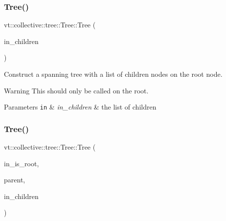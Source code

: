 \subsubsection{\texorpdfstring{Tree()}{Tree()}\hspace{0.1cm}{\footnotesize\ttfamily [2/3]}}
{\footnotesize\ttfamily vt\+::collective\+::tree\+::\+Tree\+::\+Tree (\begin{DoxyParamCaption}\item[{\hyperlink{structvt_1_1collective_1_1tree_1_1_tree_a834e7b54ea2dceae42db7c5ea859753f}{Node\+List\+Type} const \&}]{in\+\_\+children }\end{DoxyParamCaption})\hspace{0.3cm}{\ttfamily [explicit]}}



Construct a spanning tree with a list of children nodes on the root node. 

\begin{DoxyWarning}{Warning}
This should only be called on the root.
\end{DoxyWarning}

\begin{DoxyParams}[1]{Parameters}
\mbox{\tt in}  & {\em in\+\_\+children} & the list of children \\
\hline
\end{DoxyParams}
\mbox{\label{structvt_1_1collective_1_1tree_1_1_tree_a949f8b592559125bf225bd3828bd6b88}} 
\subsubsection{\texorpdfstring{Tree()}{Tree()}\hspace{0.1cm}{\footnotesize\ttfamily [3/3]}}
{\footnotesize\ttfamily vt\+::collective\+::tree\+::\+Tree\+::\+Tree (\begin{DoxyParamCaption}\item[{bool const}]{in\+\_\+is\+\_\+root,  }\item[{\hyperlink{namespacevt_a866da9d0efc19c0a1ce79e9e492f47e2}{Node\+Type} const \&}]{parent,  }\item[{\hyperlink{structvt_1_1collective_1_1tree_1_1_tree_a834e7b54ea2dceae42db7c5ea859753f}{Node\+List\+Type} const \&}]{in\+\_\+children }\end{DoxyParamCaption})}



